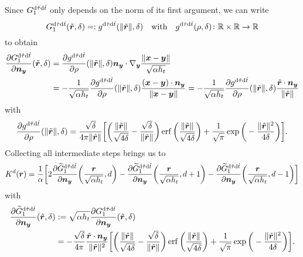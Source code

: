 \documentclass[a4paper,11pt]{article}
\begin{document}
Since $G^{{\mathrm{d}}\hat\tau{\mathrm{d}}\hat t}_1$ only depends on the norm of its first argument, we can write 
\begin{equation}
  \label{eq:G_to_g}
  G^{{\mathrm{d}}\hat\tau{\mathrm{d}}\hat t}_1(\tilde{{{\bm{r}}}},\delta) =: g^{{\mathrm{d}}\hat\tau{\mathrm{d}}\hat t}(\|\tilde{{{\bm{r}}}}\|,\delta) \quad\text{with}\quad g^{{\mathrm{d}}\hat\tau{\mathrm{d}}\hat t}(\rho,\delta)\colon {\mathbb{R}}\times{\mathbb{R}}\to{\mathbb{R}}
\end{equation}
to obtain
\begin{equation}
\label{eq:dn_G_dt_dtau}
\begin{aligned}
  \frac{\partial G^{{\mathrm{d}}\hat\tau{\mathrm{d}}\hat t}_1}{\partial {\ensuremath{{\bm{n}}}}_{{\bm{y}}}}(\tilde{{{\bm{r}}}},\delta) &= \frac{\partial g^{{\mathrm{d}}\hat\tau{\mathrm{d}}\hat t}}{\partial \rho}(\|\tilde{{{\bm{r}}}}\|,\delta) {{\bm{n}}}_{{\bm{y}}} \cdot \nabla_{{\bm{y}}} \frac{\|{{\bm{x}}}-{{\bm{y}}}\|}{\sqrt{\alpha h_t}} \\
  &= -\frac{1}{\sqrt{\alpha h_t}} \frac{\partial g^{{\mathrm{d}}\hat\tau{\mathrm{d}}\hat t}}{\partial \rho}(\|\tilde{{{\bm{r}}}}\|,\delta) \frac{({{\bm{x}}}-{{\bm{y}}})\cdot {\ensuremath{{\bm{n}}}}_{{\bm{y}}}}{\|{{\bm{x}}}-{{\bm{y}}}\|} = -\frac{1}{\sqrt{\alpha h_t}} \frac{\partial g^{{\mathrm{d}}\hat\tau{\mathrm{d}}\hat t}}{\partial \rho}(\|\tilde{{{\bm{r}}}}\|,\delta) \frac{\tilde {{{\bm{r}}}} \cdot {\ensuremath{{\bm{n}}}}_{{\bm{y}}}}{\|\tilde {{{\bm{r}}}}\|}
\end{aligned}
\end{equation}
with
\begin{equation*}
  \frac{\partial g^{{\mathrm{d}}\hat\tau{\mathrm{d}}\hat t}}{\partial \rho}(\|\tilde{{{\bm{r}}}}\|,\delta) =\frac{\sqrt{\delta}}{4\pi\|\tilde {{{\bm{r}}}}\|} \bigg[  \bigg( \frac{\|\tilde {{{\bm{r}}}}\|}{\sqrt{4\delta}} - \frac{\sqrt{\delta}}{\|\tilde {{{\bm{r}}}}\|} \bigg) \operatorname{erf}\bigg( \frac{\|\tilde {{{\bm{r}}}}\|}{\sqrt{4\delta}} \bigg) + \frac{1}{\sqrt{\pi}} \exp \bigg( -\frac{\|\tilde {{{\bm{r}}}}\|^2}{4\delta} \bigg) \bigg].
\end{equation*}
Collecting all intermediate steps brings us to
\begin{align*}
  K^d({{\bm{r}}}) = \frac{1}{\alpha} \bigg[ 2 \frac{\partial \widetilde G^{{\mathrm{d}}\hat\tau{\mathrm{d}}\hat t}_1}{\partial {\ensuremath{{\bm{n}}}}_{{\bm{y}}}} \bigg(\frac{{{\bm{r}}}}{\sqrt{\alpha h_t}},d\bigg) - \frac{\partial \widetilde G^{{\mathrm{d}}\hat\tau{\mathrm{d}}\hat t}_1}{\partial {\ensuremath{{\bm{n}}}}_{{\bm{y}}}}\bigg(\frac{{{\bm{r}}}}{\sqrt{\alpha h_t}},d+1\bigg) - \frac{\partial \widetilde G^{{\mathrm{d}}\hat\tau{\mathrm{d}}\hat t}_1}{\partial {\ensuremath{{\bm{n}}}}_{{\bm{y}}}}\bigg(\frac{{{\bm{r}}}}{\sqrt{\alpha h_t}},d-1\bigg) \bigg]
\end{align*}
with
\begin{align*}
  \frac{\partial \widetilde G^{{\mathrm{d}}\hat\tau{\mathrm{d}}\hat t}_1}{\partial {\ensuremath{{\bm{n}}}}_{{\bm{y}}}}(\tilde {{{\bm{r}}}},\delta) &:= \sqrt{\alpha h_t}\frac{\partial G^{{\mathrm{d}}\hat\tau{\mathrm{d}}\hat t}_1}{\partial {\ensuremath{{\bm{n}}}}_{{\bm{y}}}}(\tilde {{{\bm{r}}}},\delta) \\
  &= - \frac{\sqrt{\delta}}{4\pi} \frac{\tilde {{{\bm{r}}}} \cdot {\ensuremath{{\bm{n}}}}_{{\bm{y}}}}{\|\tilde {{{\bm{r}}}}\|^2} \bigg[  \bigg( \frac{\|\tilde {{{\bm{r}}}}\|}{\sqrt{4\delta}} - \frac{\sqrt{\delta}}{\|\tilde {{{\bm{r}}}}\|} \bigg) \operatorname{erf}\bigg( \frac{\|\tilde {{{\bm{r}}}}\|}{\sqrt{4\delta}} \bigg) + \frac{1}{\sqrt{\pi}} \exp \bigg( -\frac{\|\tilde {{{\bm{r}}}}\|^2}{4\delta} \bigg) \bigg].
\end{align*}
\end{document}
